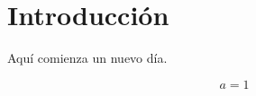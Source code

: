 \section{Introducción}

Aquí comienza un nuevo día.

     \begin{equation}
          a=1
     \end{equation}
